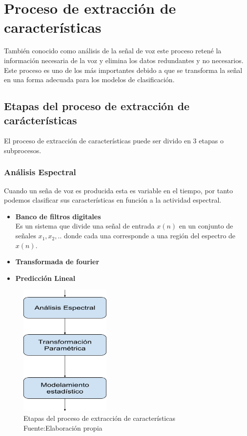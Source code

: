 \section{Proceso de extracción de características}

También conocido como análisis de la señal de voz este proceso retené la información necesaria de la voz y elimina los datos redundantes y no necesarios. Este proceso es uno de los más importantes debido a que se transforma la señal en una forma adecuada para los modelos de clasificación. 
\subsection{Etapas del proceso de extracción de carácterísticas}

El proceso de extracción de características puede ser divido en 3 etapas o subprocesos.
\subsubsection{Análisis Espectral}
Cuando un seña de voz es producida esta es variable en el tiempo, por tanto podemos clasificar sus características en función a la actividad espectral.
\begin{itemize}
	\item \textbf{Banco de filtros digitales\\}
	Es un sistema que divide una señal de entrada $x(n)$ en un conjunto de señales $x_{1},x_{2},..$ donde cada una corresponde a una región del espectro de $x(n)$.
	\item \textbf{Transformada de fourier\\}
	\item \textbf{Predicción Lineal\\}
\end{itemize}

\begin{figure}[H]
	\centering
	\includegraphics[width=0.4\textwidth]{Figures/proceso.png}
	\caption{Etapas del proceso de extracción de características\\ Fuente:Elaboración propia}
	\label{onda}
\end{figure}

